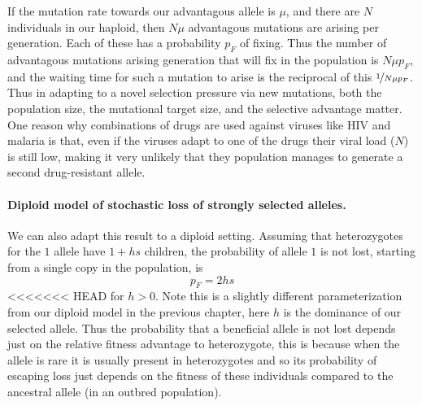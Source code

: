 If the mutation rate towards our advantagous allele is $\mu$, and there
are $N$ individuals in our haploid, then $N \mu$ advantagous mutations are
arising per generation.  Each of these has a probability $p_F$ of
fixing. Thus the number of advantagous mutations
arising generation that will fix in the population is $N \mu p_F$, and
the waiting time for such a mutation to arise is the reciprocal of
this $\nicefrac{1}{N\mu p_F}$. Thus in adapting to a novel selection
pressure via new mutations, both the population size, the mutational
target size, and the selective advantage matter. One reason why combinations of drugs
are used against viruses like HIV and malaria is that, even if the viruses adapt to one
of the drugs their viral load ($N$) is still low, making it very
unlikely that they population manages to generate a second drug-resistant allele.

\paragraph{Diploid model of stochastic loss of strongly selected alleles.}
We can also adapt this result to a diploid setting.
Assuming that heterozygotes for the $1$ allele have $1+hs$ children, the
probability of allele $1$ is not lost, starting from a single copy in
the population, is
\begin{equation}
p_F = 2 h s \label{eqn:diploid_escape}
\end{equation}
<<<<<<< HEAD
for $h>0$. Note this is a slightly different parameterization from
our diploid model in the previous chapter, here $h$ is the dominance of our selected
allele. Thus the probability that a beneficial allele is not lost depends just
on the relative fitness advantage to heterozygote, this is because
when the allele is rare it is usually present in heterozygotes and so
its probability of escaping loss just depends on the fitness of these
individuals compared to the ancestral allele (in an
outbred population). \\

